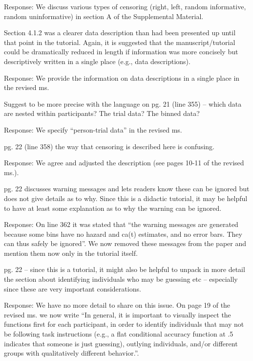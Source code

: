 \documentclass[
]{article}
\renewenvironment{quote}{\begin{leftbar}}{\end{leftbar}}
\begin{document}
Response: We discuss various types of censoring (right, left, random
informative, random uninformative) in section A of the Supplemental
Material.

\begin{quote}
Section 4.1.2 was a clearer data description than had been presented up
until that point in the tutorial. Again, it is suggested that the
manuscript/tutorial could be dramatically reduced in length if
information was more concisely but descriptively written in a single
place (e.g., data descriptions).
\end{quote}

Response: We provide the information on data descriptions in a single
place in the revised ms.

\begin{quote}
Suggest to be more precise with the language on pg. 21 (line 355) --
which data are nested within participants? The trial data? The binned
data?
\end{quote}

Response: We specify ``person-trial data'' in the revised ms.

\begin{quote}
pg. 22 (line 358) the way that censoring is described here is confusing.
\end{quote}

Response: We agree and adjusted the description (see pages 10-11 of the
revised ms.).

\begin{quote}
pg. 22 discusses warning messages and lets readers know these can be
ignored but does not give details as to why. Since this is a didactic
tutorial, it may be helpful to have at least some explanation as to why
the warning can be ignored.
\end{quote}

Response: On line 362 it was stated that ``the warning messages are
generated because some bins have no hazard and ca(t) estimates, and no
error bars. They can thus safely be ignored''. We now removed these
messages from the paper and mention them now only in the tutorial
itself.

\begin{quote}
pg. 22 -- since this is a tutorial, it might also be helpful to unpack
in more detail the section about identifying individuals who may be
guessing etc -- especially since these are very important
considerations.
\end{quote}

Response: We have no more detail to share on this issue. On page 19 of
the revised ms. we now write ``In general, it is important to visually
inspect the functions first for each participant, in order to identify
individuals that may not be following task instructions (e.g., a flat
conditional accuracy function at .5 indicates that someone is just
guessing), outlying individuals, and/or different groups with
qualitatively different behavior.''.
\end{document}
